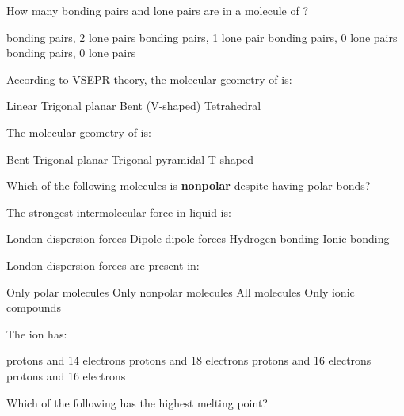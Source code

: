 \documentclass[addpoints]{exam}
\begin{document}
\begin{questions}
\question[1] How many bonding pairs and lone pairs are in a molecule of ?
\begin{choices}
     bonding pairs, 2 lone pairs
     bonding pairs, 1 lone pair
     bonding pairs, 0 lone pairs
     bonding pairs, 0 lone pairs
\end{choices}

\question[1] According to VSEPR theory, the molecular geometry of  is:
\begin{choices}
    \choice Linear
    \choice Trigonal planar
    \correctchoice Bent (V-shaped)
    \choice Tetrahedral
\end{choices}

\question[1] The molecular geometry of  is:
\begin{choices}
    \choice Bent
    \correctchoice Trigonal planar
    \choice Trigonal pyramidal
    \choice T-shaped
\end{choices}

\question[1] Which of the following molecules is \textbf{nonpolar} despite having polar bonds?
\begin{choices}
    \choice {}
    \choice {}
    \correctchoice {}
    \choice {}
\end{choices}

\question[1] The strongest intermolecular force in liquid  is:
\begin{choices}
    \choice London dispersion forces
    \choice Dipole-dipole forces
    \correctchoice Hydrogen bonding
    \choice Ionic bonding
\end{choices}

\question[1] London dispersion forces are present in:
\begin{choices}
    \choice Only polar molecules
    \choice Only nonpolar molecules
    \correctchoice All molecules
    \choice Only ionic compounds
\end{choices}

\question[1] The ion  has:
\begin{choices}
     protons and 14 electrons
     protons and 18 electrons
     protons and 16 electrons
     protons and 16 electrons
\end{choices}

\question[1] Which of the following has the highest melting point?
\begin{choices}
    \choice {}
    \choice {}
    \correctchoice {}
    \choice {}
\end{choices}


\end{questions}
\end{document}
